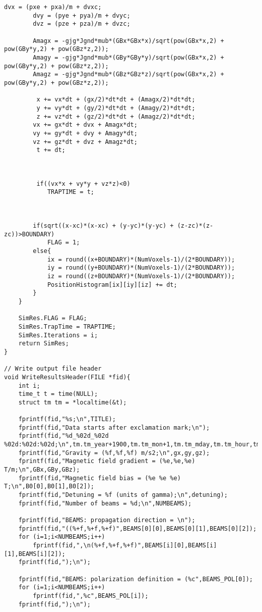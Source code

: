 \begin{lstlisting}[style=CStyle]
        dvx = (pxe + pxa)/m + dvxc;
        dvy = (pye + pya)/m + dvyc;
        dvz = (pze + pza)/m + dvzc;

        Amagx = -gjg*Jgnd*mub*(GBx*GBx*x)/sqrt(pow(GBx*x,2) + pow(GBy*y,2) + pow(GBz*z,2));
        Amagy = -gjg*Jgnd*mub*(GBy*GBy*y)/sqrt(pow(GBx*x,2) + pow(GBy*y,2) + pow(GBz*z,2));
        Amagz = -gjg*Jgnd*mub*(GBz*GBz*z)/sqrt(pow(GBx*x,2) + pow(GBy*y,2) + pow(GBz*z,2));

         x += vx*dt + (gx/2)*dt*dt + (Amagx/2)*dt*dt;
         y += vy*dt + (gy/2)*dt*dt + (Amagy/2)*dt*dt;
         z += vz*dt + (gz/2)*dt*dt + (Amagz/2)*dt*dt;
        vx += gx*dt + dvx + Amagx*dt;
        vy += gy*dt + dvy + Amagy*dt;
        vz += gz*dt + dvz + Amagz*dt;
         t += dt;



         if((vx*x + vy*y + vz*z)<0)
            TRAPTIME = t;



        if(sqrt((x-xc)*(x-xc) + (y-yc)*(y-yc) + (z-zc)*(z-zc))>BOUNDARY)
            FLAG = 1;
        else{
            ix = round((x+BOUNDARY)*(NumVoxels-1)/(2*BOUNDARY));
            iy = round((y+BOUNDARY)*(NumVoxels-1)/(2*BOUNDARY));
            iz = round((z+BOUNDARY)*(NumVoxels-1)/(2*BOUNDARY));
            PositionHistogram[ix][iy][iz] += dt;
        }
    }

    SimRes.FLAG = FLAG;
    SimRes.TrapTime = TRAPTIME;
    SimRes.Iterations = i;
    return SimRes;
}

// Write output file header
void WriteResultsHeader(FILE *fid){
    int i;
    time_t t = time(NULL);
    struct tm tm = *localtime(&t);

    fprintf(fid,"%s;\n",TITLE);
    fprintf(fid,"Data starts after exclamation mark;\n");
    fprintf(fid,"%d_%02d_%02d %02d:%02d:%02d;\n",tm.tm_year+1900,tm.tm_mon+1,tm.tm_mday,tm.tm_hour,tm.tm_min,tm.tm_sec);
    fprintf(fid,"Gravity = (%f,%f,%f) m/s2;\n",gx,gy,gz);
    fprintf(fid,"Magnetic field gradient = (%e,%e,%e) T/m;\n",GBx,GBy,GBz);
    fprintf(fid,"Magnetic field bias = (%e %e %e) T;\n",B0[0],B0[1],B0[2]);
    fprintf(fid,"Detuning = %f (units of gamma);\n",detuning);
    fprintf(fid,"Number of beams = %d;\n",NUMBEAMS);

    fprintf(fid,"BEAMS: propagation direction = \n");
    fprintf(fid,"((%+f,%+f,%+f)",BEAMS[0][0],BEAMS[0][1],BEAMS[0][2]);
    for (i=1;i<NUMBEAMS;i++)
        fprintf(fid,",\n(%+f,%+f,%+f)",BEAMS[i][0],BEAMS[i][1],BEAMS[i][2]);
    fprintf(fid,");\n");

    fprintf(fid,"BEAMS: polarization definition = (%c",BEAMS_POL[0]);
    for (i=1;i<NUMBEAMS;i++)
        fprintf(fid,",%c",BEAMS_POL[i]);
    fprintf(fid,");\n");


\end{lstlisting}
